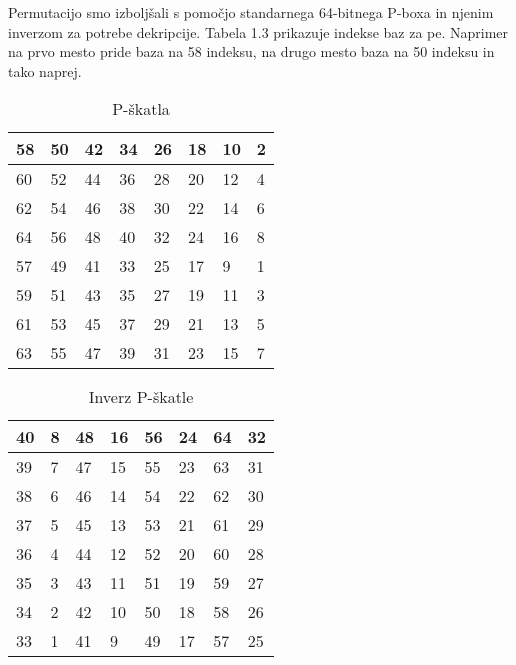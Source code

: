 \documentclass[graybox, envcountchap]{svmult}
\begin{document}
\noindent
Permutacijo smo izboljšali s pomočjo standarnega 64-bitnega P-boxa in njenim inverzom za potrebe dekripcije. Tabela 1.3 prikazuje indekse baz za pe. Naprimer na prvo mesto pride baza na 58 indeksu, na drugo mesto baza na 50 indeksu in tako naprej.

%
%	
%	
%	
%

\begin{table}[!ht]
    \centering
    \begin{tabular}{|l|l|l|l|l|l|l|l|}
    \hline
        58 & 50 & 42 & 34 & 26 & 18 & 10 & 2 \\ \hline
        60 & 52 & 44 & 36 & 28 & 20 & 12 & 4 \\ \hline
        62 & 54 & 46 & 38 & 30 & 22 & 14 & 6 \\ \hline
        64 & 56 & 48 & 40 & 32 & 24 & 16 & 8 \\ \hline
        57 & 49 & 41 & 33 & 25 & 17 & 9 & 1 \\ \hline
        59 & 51 & 43 & 35 & 27 & 19 & 11 & 3 \\ \hline
        61 & 53 & 45 & 37 & 29 & 21 & 13 & 5 \\ \hline
        63 & 55 & 47 & 39 & 31 & 23 & 15 & 7 \\ \hline
    \end{tabular}
    \caption{P-škatla}
    \label{table 3}
\end{table}

\begin{table}[!ht]
    \centering
    \begin{tabular}{|l|l|l|l|l|l|l|l|}
    \hline
        40 & 8 & 48 & 16 & 56 & 24 & 64 & 32 \\ \hline
        39 & 7 & 47 & 15 & 55 & 23 & 63 & 31 \\ \hline
        38 & 6 & 46 & 14 & 54 & 22 & 62 & 30 \\ \hline
        37 & 5 & 45 & 13 & 53 & 21 & 61 & 29 \\ \hline
        36 & 4 & 44 & 12 & 52 & 20 & 60 & 28 \\ \hline
        35 & 3 & 43 & 11 & 51 & 19 & 59 & 27 \\ \hline
        34 & 2 & 42 & 10 & 50 & 18 & 58 & 26 \\ \hline
        33 & 1 & 41 & 9 & 49 & 17 & 57 & 25 \\ \hline
    \end{tabular}
    \caption{Inverz P-škatle}
    \label{table 4}
\end{table}
\end{document}
